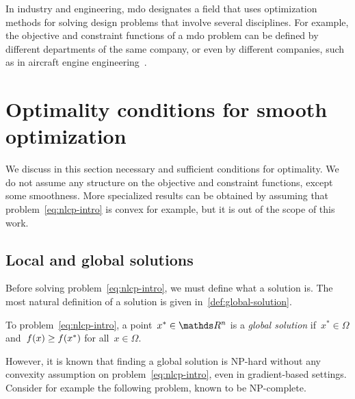 In industry and engineering, \gls{mdo} designates a field that uses optimization methods for solving design problems that involve several disciplines.
For example, the objective and constraint functions of a \gls{mdo} problem can be defined by different departments of the same company, or even by different companies, such as in aircraft engine engineering~\cite{Gazaix_Etal_2019}.

\section{Optimality conditions for smooth optimization}

We discuss in this section necessary and sufficient conditions for optimality.
We do not assume any structure on the objective and constraint functions, except some smoothness.
More specialized results can be obtained by assuming that problem~\cref{eq:nlcp-intro} is convex for example, but it is out of the scope of this work.

\subsection{Local and global solutions}

Before solving problem~\cref{eq:nlcp-intro}, we must define what a solution is.
The most natural definition of a solution is given in~\cref{def:global-solution}.

\begin{definition}
    \label{def:global-solution}
    To problem~\cref{eq:nlcp-intro}, a point~$x^{\ast} \in \R^n$ is a \emph{global solution} if~$x^{\ast} \in \Omega$ and~$f(x) \ge f(x^{\ast})$ for all~$x \in \Omega$.
\end{definition}



However, it is known that finding a global solution is NP-hard without any convexity assumption on problem~\cref{eq:nlcp-intro}, even in gradient-based settings.
Consider for example the following problem, known to be NP-complete.

